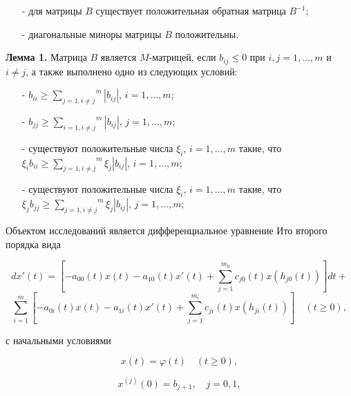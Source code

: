 \begin{itemize}
	\item[-]
	для матрицы  $B$ существует положительная обратная матрица $B^{-1}$;
	
	\item[-]
	диагональные миноры матрицы  $B$ положительны.
\end{itemize}

\textbf{Лемма 1.} \cite{kri-bib-18} Матрица $B$ является $M$-матрицей, если $b_{ij}\le 0$ при $i,j=1,\dots,m$ и $i\neq j$, а также выполнено одно из следующих условий:

\begin{itemize}
	\item[-]
	$b_{ii}\ge \overset m{\underset{j=1,i\neq j}{\sum }}|b_{ij}|$, $i=1,\dots,m$;
	
	\item[-]
	$b_{jj}\ge \overset m{\underset{i=1,i\neq j}{\sum }}|b_{ij}|$, $j=1,\dots,m$;
	
	\item[-]
	существуют положительные числа $\xi_i$, $i=1,\dots,m$ такие, что $\xi_ib_{ii}\ge \overset m{\underset{j=1,i\neq j}{\sum}}\xi_j|b_{ij}|$, $i=1,\dots,m$;
	
	\item[-]
	существуют положительные числа $\xi_i$, $i=1,\dots,m$ такие, что $\xi_jb_{jj}\ge \overset m{\underset{j=1,i\neq j}{\sum}}\xi_j|b_{ij}|$, $j=1,\dots,m$;
\end{itemize}

Объектом исследований является дифференциальное уравнение Ито второго порядка вида

\begin{equation}\label{kri-eq-1}
	dx'(t) = \left[-a_{00}(t)x(t) - a_{10}(t)x'(t) + \sum_{j=1}^{m_0}c_{j0}(t)x(h_{j0}(t))\right]dt +
\end{equation}
\begin{equation*}
	\sum_{i=1}^{m} \left[-a_{0i}(t)x(t)-a_{1i}(t)x'(t)+\sum_{j=1}^{m_i}c_{ji}(t)x(h_{ji}(t))\right] \quad (t \ge 0),
\end{equation*}

с начальными условиями

\begin{equation}\label{kri-eq-1a}
	x(t)=\varphi (t)\quad(t\ge 0),
\end{equation}

\begin{equation}\label{kri-eq-1b}
	x^{(j)}(0)=b_{j+1}, \quad j=0,1,
\end{equation}

